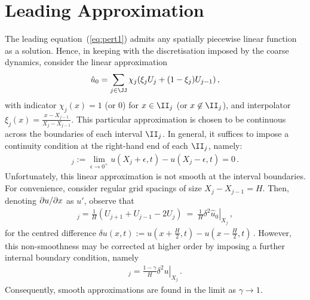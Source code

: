 \documentclass[12pt,a5paper]{article}
\begin{document}
\section{Leading Approximation}
The leading equation~(\ref{eq:pert1}) admits any spatially piecewise linear function as a solution. 
Hence, in keeping
with the discretisation imposed by the coarse dynamics, 
consider the linear approximation
\begin{eqnarray}
   \hat{u}_0 = \sum_{j\in\JJ}\chi_j(\xi_j U_j+(1-\xi_j)U_{j-1})\,,
\label{eq:uhat0}
\end{eqnarray}
with indicator $\chi_j(x)=1$ (or 0) for $x\in\II_j$ (or $x\not\in\II_j$), and interpolator
$\xi_j(x)=\frac{x-X_{j-1}}{X_j-X_{j-1}}$.
This particular approximation is chosen to be continuous across the boundaries of each interval $\II_j$. 
In general, it suffices 
to impose a continuity condition at the right-hand end of each $\II_j$, namely:
\begin{eqnarray}
   [u]_j := \lim_{\epsilon\rightarrow 0^{+}} u(X_j+\epsilon,t)-u(X_j-\epsilon,t)= 0\,.
\label{eq:cont-cond}
\end{eqnarray}
Unfortunately, this linear approximation is not smooth at the interval boundaries. 
For convenience, consider regular grid spacings of size 
$X_j-X_{j-1}=H$. Then, denoting $\D xu$ as $u'$, observe that
\begin{eqnarray}
   [\hat{u}'_0]_j = \frac{1}{H}(U_{j+1}+U_{j-1}-2U_j)~=~\frac{1}{H}\left.\delta^{2}\hat{u}_0\right|_{X_j}\,,
\end{eqnarray}
for the centred difference $\delta u(x,t):= u(x+\frac{H}{2},t)-u(x-\frac{H}{2},t)$\,.
However, this non-smoothness may be corrected at higher order by imposing a further internal boundary condition, namely
\begin{eqnarray}
   [u']_j = \frac{1-\gamma}{H}\left.\delta^{2}u\right|_{X_j}\,.
\label{eq:smooth-cond}
\end{eqnarray}
Consequently, smooth approximations are found in the limit as $\gamma\rightarrow 1$.
\end{document}
